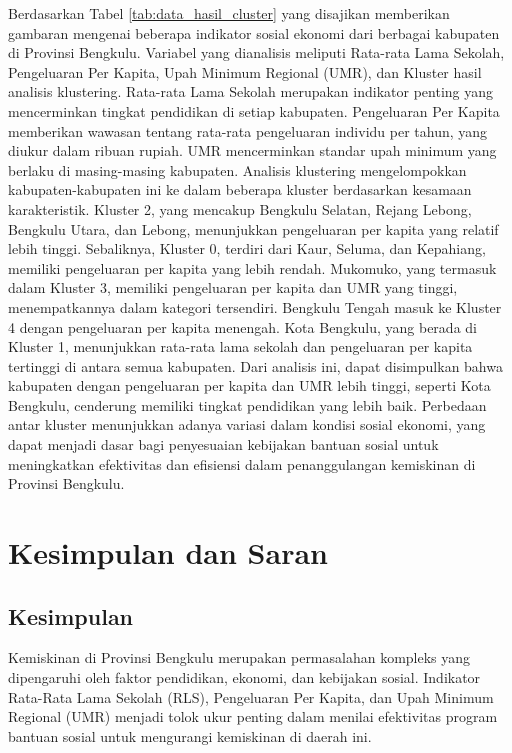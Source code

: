 \documentclass{article}
\begin{document}
Berdasarkan Tabel \ref{tab:data_hasil_cluster} yang disajikan memberikan gambaran mengenai beberapa indikator sosial ekonomi dari berbagai kabupaten di Provinsi Bengkulu. Variabel yang dianalisis meliputi Rata-rata Lama Sekolah, Pengeluaran Per Kapita, Upah Minimum Regional (UMR), dan Kluster hasil analisis klustering. Rata-rata Lama Sekolah merupakan indikator penting yang mencerminkan tingkat pendidikan di setiap kabupaten. Pengeluaran Per Kapita memberikan wawasan tentang rata-rata pengeluaran individu per tahun, yang diukur dalam ribuan rupiah. UMR mencerminkan standar upah minimum yang berlaku di masing-masing kabupaten. Analisis klustering mengelompokkan kabupaten-kabupaten ini ke dalam beberapa kluster berdasarkan kesamaan karakteristik. Kluster 2, yang mencakup Bengkulu Selatan, Rejang Lebong, Bengkulu Utara, dan Lebong, menunjukkan pengeluaran per kapita yang relatif lebih tinggi. Sebaliknya, Kluster 0, terdiri dari Kaur, Seluma, dan Kepahiang, memiliki pengeluaran per kapita yang lebih rendah. Mukomuko, yang termasuk dalam Kluster 3, memiliki pengeluaran per kapita dan UMR yang tinggi, menempatkannya dalam kategori tersendiri. Bengkulu Tengah masuk ke Kluster 4 dengan pengeluaran per kapita menengah. Kota Bengkulu, yang berada di Kluster 1, menunjukkan rata-rata lama sekolah dan pengeluaran per kapita tertinggi di antara semua kabupaten. Dari analisis ini, dapat disimpulkan bahwa kabupaten dengan pengeluaran per kapita dan UMR lebih tinggi, seperti Kota Bengkulu, cenderung memiliki tingkat pendidikan yang lebih baik. Perbedaan antar kluster menunjukkan adanya variasi dalam kondisi sosial ekonomi, yang dapat menjadi dasar bagi penyesuaian kebijakan bantuan sosial untuk meningkatkan efektivitas dan efisiensi dalam penanggulangan kemiskinan di Provinsi Bengkulu.


\section{Kesimpulan dan Saran}

\subsection{Kesimpulan}

Kemiskinan di Provinsi Bengkulu merupakan permasalahan kompleks yang dipengaruhi oleh faktor pendidikan, ekonomi, dan kebijakan sosial. Indikator Rata-Rata Lama Sekolah (RLS), Pengeluaran Per Kapita, dan Upah Minimum Regional (UMR) menjadi tolok ukur penting dalam menilai efektivitas program bantuan sosial untuk mengurangi kemiskinan di daerah ini. 
\end{document}
